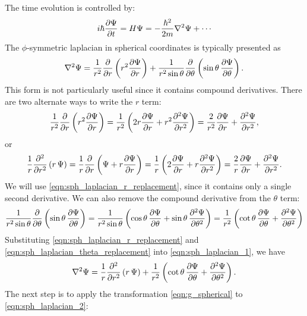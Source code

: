 \documentclass[12pt]{article}
\numberwithin{equation}{section}
\begin{document}
The time evolution is controlled by:
\begin{align*}
i \hbar \pdv{\Psi}{t} = H\Psi = -\frac{\hbar^2}{2m} \laplacian{\Psi} + \cdots
\end{align*}
The $\phi$-symmetric laplacian in spherical coordinates is typically presented as
\begin{align}\label{eqn:sph_laplacian_1}
\laplacian{\Psi} = \frac{1}{r^2} \pdv{}{r} \left(r^2 \pdv{\Psi}{r}\right) + \frac{1}{r^2 \sin{\theta}}\pdv{}{\theta} \left(\sin{\theta} \,  \pdv{\Psi}{\theta}\right).
\end{align}
This form is not particularly useful since it contains compound derivatives. There are two alternate ways to write the $r$ term:
\begin{align*}
\frac{1}{r^2} \pdv{}{r} \left(r^2 \pdv{\Psi}{r}\right) = \frac{1}{r^2} \left(2r\pdv{\Psi}{r} + r^2 \pdv[2]{\Psi}{r}\right) = \frac{2}{r^2} \pdv{\Psi}{r} + \pdv[2]{\Psi}{r},
\end{align*}
or
\begin{align}\label{eqn:sph_laplacian_r_replacement}
\frac{1}{r} \pdv[2]{}{r} \left(r \, \Psi\right) = \frac{1}{r} \pdv{}{r} \left(\Psi + r \pdv{\Psi}{r}\right) = \frac{1}{r} \left(2\pdv{\Psi}{r} + r \pdv[2]{\Psi}{r}\right) = \frac{2}{r} \pdv{\Psi}{r} + \pdv[2]{\Psi}{r}.
\end{align}
We will use \eqref{eqn:sph_laplacian_r_replacement}, since it contains only a single second derivative. We can also remove the compound derivative from the $\theta$ term:
\begin{align}\label{eqn:sph_laplacian_theta_replacement}
\frac{1}{r^2 \sin{\theta}} \pdv{}{\theta} \left(\sin{\theta} \, \pdv{\Psi}{\theta}\right) = \frac{1}{r^2 \sin{\theta}} \left(\cos{\theta} \, \pdv{\Psi}{\theta} + \sin{\theta} \, \pdv[2]{\Psi}{\theta}\right) = \frac{1}{r^2} \left(\cot{\theta} \, \pdv{\Psi}{\theta} + \pdv[2]{\Psi}{\theta}\right)
\end{align}
Substituting \eqref{eqn:sph_laplacian_r_replacement} and \eqref{eqn:sph_laplacian_theta_replacement} into \eqref{eqn:sph_laplacian_1}, we have
\begin{align}\label{eqn:sph_laplacian_2}
\laplacian{\Psi} = \frac{1}{r} \pdv[2]{}{r} \left(r \, \Psi\right) + \frac{1}{r^2} \left(\cot{\theta} \, \pdv{\Psi}{\theta} + \pdv[2]{\Psi}{\theta}\right).
\end{align}
The next step is to apply the transformation \eqref{eqn:g_spherical} to \eqref{eqn:sph_laplacian_2}:
\end{document}
